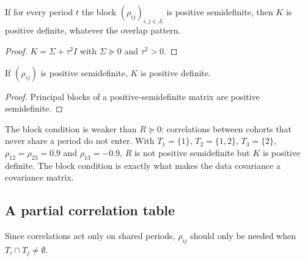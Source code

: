 \begin{theorem}\label{thm:U_K_posDef}
  \leanok
  If for every period $t$ the block $(\rho_{ij})_{i,j \in J_t}$ is positive
  semidefinite, then $K$ is positive definite, whatever the overlap pattern.
\end{theorem}
\begin{proof}
  \leanok
  $K = \Sigma + \tau^2 I$ with $\Sigma \succeq 0$ and $\tau^2 > 0$.
\end{proof}

\begin{corollary}\label{cor:U_K_posDef}
  \leanok
  If $(\rho_{ij})$ is positive semidefinite, $K$ is positive definite.
\end{corollary}
\begin{proof}
  \leanok
  Principal blocks of a positive-semidefinite matrix are positive semidefinite.
\end{proof}

\begin{remark}\label{rem:unequal_posdef}
  The block condition is weaker than $R \succeq 0$: correlations between
  cohorts that never share a period do not enter. With $T_1 = \{1\}$,
  $T_2 = \{1,2\}$, $T_3 = \{2\}$, $\rho_{12} = \rho_{23} = 0.9$ and
  $\rho_{13} = -0.9$, $R$ is not positive semidefinite but $K$ is positive
  definite. The block condition is exactly what makes the data covariance a
  covariance matrix.
\end{remark}

\subsection*{A partial correlation table}

Since correlations act only on shared periods, $\rho_{ij}$ should only be
needed when $T_i \cap T_j \neq \emptyset$.

